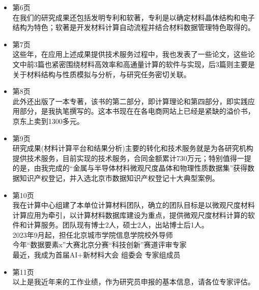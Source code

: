 \begin{itemize}
所以我们在为科研团队提供技术服务的时候，特别注意到对材料结构和物性数据的积累，形成我们的自己的材料数据库，因为微观材料数据是材料学研究最基础的数据底座。
\item 第6页\\
	在我们的研究成果还包括发明专利和软著，专利是以确定材料晶体结构和电子结构为特色；软著是开发材料计算自动流程并结合材料数据管理特色取得的。
\item 第7页\\
	这些年，在应用上述成果提供技术服务过程中，我也发表了一些论文，这些论文中前3篇也紧密围绕材料高效率和高通量计算的软件与实现，后3篇则主要是关于材料结构与性质模拟与分析，与研究任务密切关联。
\item 第8页\\
	此外还出版了一本专著，该书的第二部分，即计算理论和第四部分，即实践应用部分，是我执笔撰写的。这本书现在在各电商网站上已经是紧缺的溢价书，京东上卖到1300多元。
\item 第9页\\
	研究成果(材料计算平台和结果分析)主要的转化和技术服务就是为各研究机构提供技术服务，目前实现的技术服务，合同金额累计730万元；特别值得一提的是，由我完成的``金属与半导体材料微观尺度晶体和物理性质数据集''获得数据知识产权登记，并入选北京市数据知识产权登记十大典型案例。
\item 第10页\\
	我在计算中心组建了本单位计算材料团队，确立的团队目标是以微观尺度材料计算应用为牵引，以计算材料数据库建设为重点，提供微观尺度材料计算的软件和计算服务。团队现有博士2人，硕士2人，出站博士后1人。\\
	2023年9月起，担任北京城市学院信息学院校外导师\\
	今年``数据要素x''大赛北京分赛``科技创新''赛道评审专家\\
	最近，我成为首届AI+新材料大会 组委会 专家组成员
\item 第11页\\
	以上是我近年来的工作业绩，作为研究员申报的基本信息，请各位专家评估。
\end{itemize}

